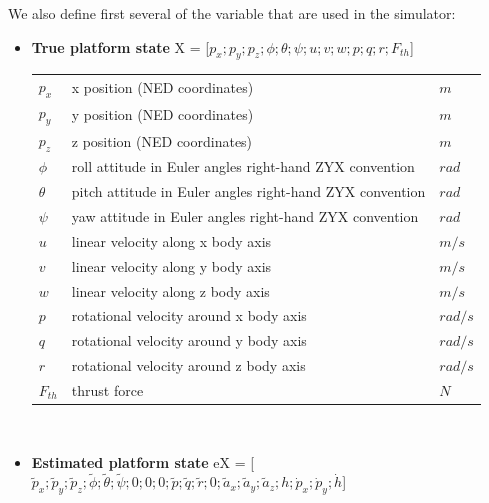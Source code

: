 \documentclass[a4paper,11pt]{report}
\begin{document}
We also define first several of the variable that are used in the simulator:
\begin{itemize}

\item \textbf{True platform state} X = [$p_x;p_y;p_z;\phi;\theta;\psi;u;v;w;p;q;r;F_{th}$]

\begin{tabular}{lll}
    $p_x$ & x position (NED coordinates)                            & $m$\\
    $p_y$ & y position (NED coordinates)                            & $m$\\
    $p_z$ & z position (NED coordinates)                            & $m$\\
   $\phi$ & roll attitude in Euler angles right-hand ZYX convention & $rad$\\
 $\theta$ & pitch attitude in Euler angles right-hand ZYX convention & $rad$\\
   $\psi$ & yaw attitude in Euler angles right-hand ZYX convention  & $rad$\\
     $u$  & linear velocity along x body axis                       & $m/s$\\
     $v$  & linear velocity along y body axis                       & $m/s$\\
     $w$  & linear velocity along z body axis                       & $m/s$\\
     $p$  & rotational velocity around x body axis                  & $rad/s$\\ 
     $q$  & rotational velocity around y body axis                  & $rad/s$\\ 
     $r$  & rotational velocity around z body axis                  & $rad/s$\\ 
 $F_{th}$ & thrust force                                            & $N$
\end{tabular} 
\\

\item  \textbf{Estimated platform state} eX = [$\tilde{p}_x;\tilde{p}_y;\tilde{p}_z;\tilde{\phi};\tilde{\theta};\tilde{\psi};0;0;0;\tilde{p};\tilde{q};\tilde{r};0;\tilde{a}_x;\tilde{a}_y;\tilde{a}_z;h;\dot{p}_x;\dot{p}_y;\dot{h}$]


\end{itemize}
\end{document}
